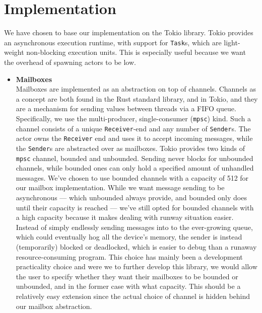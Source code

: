 \documentclass[a4paper]{article}
\begin{document}
\section{Implementation}
%
We have chosen to base our implementation on the Tokio library. Tokio provides an
asynchronous execution runtime, with support for \texttt{Task}s, which are
light-weight non-blocking execution units. This is especially useful because we
want the overhead of spawning actors to be low.
\begin{itemize}
\item{\bf Mailboxes} \\
Mailboxes are implemented as an abstraction on top of channels. Channels as a
concept are both found in the Rust standard library, and in Tokio, and they are a
mechanism for sending values between threads via a FIFO queue. Specifically, we
use the multi-producer, single-consumer (\texttt{mpsc}) kind. Such a channel
consists of a unique \texttt{Receiver}-end and any number of \texttt{Sender}s.
The actor owns the \texttt{Receiver} end and uses it to accept incoming
messages, while the \texttt{Sender}s are abstracted over as mailboxes.
Tokio
provides two kinds of \texttt{mpsc} channel, bounded and unbounded. Sending
never blocks for unbounded channels, while bounded ones can only hold a
specified amount of unhandled messages. We've chosen to use bounded channels
with a capacity of 512 for our mailbox implementation. While we want message
sending to be asynchronous --- which unbounded always provide, and bounded only
does until their capacity is reached --- we've still opted for bounded channels
with a high capacity because it makes dealing with runway situation easier.
Instead of simply endlessly sending messages into to the ever-growing queue,
which could eventually hog all the device's memory, the sender is instead
(temporarily) blocked or deadlocked, which is easier to debug than a runaway
resource-consuming program.
This choice has mainly been a development practicality choice and were we to
further develop this library, we would allow the user to specify whether they
want their mailboxes to be bounded or unbounded, and in the former case with
what capacity. This should be a relatively easy extension since the actual
choice of channel is hidden behind our mailbox abstraction.


\end{itemize}
\end{document}
